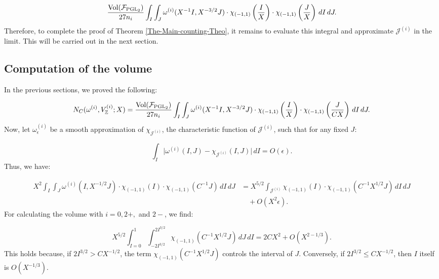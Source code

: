 \documentclass{article}
\def\Z{{\mathbb Z}}
\def\PGL{{\rm PGL}}
\def\Vol{{\rm Vol}}
\def\Z{{\mathbb Z}}
\begin{document}
\begin{equation*}
\frac{\Vol(\mathcal{F}_{\PGL_2})}{27n_i} \int_{I} \int_{J} \omega^{(i)}(X^{-1}I, X^{-3/2}J) \cdot \chi_{(-1,1)}\left(\frac{I}{X}\right) \cdot \chi_{(-1,1)}\left(\frac{J}{X}\right) \,dI \,dJ.
\end{equation*}
Therefore, to complete the proof of Theorem \ref{The-Main-counting-Theo}, it remains to evaluate this integral and approximate $\mathcal{J}^{(i)}$ in the limit. This will be carried out in the next section.
\subsection{Computation of the volume}
In the previous sections, we proved the following:

\begin{equation*}
N_C(\omega^{(i)}, V_{\Z}^{(i)}; X) = \frac{\Vol(\mathcal{F}_{\PGL_2})}{27n_i} \int_{I} \int_{J} \omega^{(i)}(X^{-1}I, X^{-3/2}J) \cdot \chi_{(-1,1)}\left(\frac{I}{X}\right) \cdot \chi_{(-1,1)}\left(\frac{J}{CX}\right) \, dI \, dJ.
\end{equation*}
Now, let $\omega^{(i)}_{\epsilon}$ be a smooth approximation of $\chi_{\mathcal{J}^{(i)}}$, the characteristic function of $\mathcal{J}^{(i)}$, such that for any fixed $J$:

\begin{equation*}
    \int_I \Big|\omega^{(i)}(I,J) - \chi_{\mathcal{J}^{(i)}}(I,J)\Big| \, dI = O(\epsilon).
\end{equation*}
Thus, we have:

\begin{align*}
    X^2 \int_{I} \int_{J} \omega^{(i)}(I, X^{-1/2}J) \cdot \chi_{(-1,1)}(I) \cdot \chi_{(-1,1)}(C^{-1}J) \, dI \, dJ &= X^{5/2} \int_{\mathcal{J}^{(i)}} \chi_{(-1,1)}(I) \cdot \chi_{(-1,1)}(C^{-1}X^{1/2}J) \, dI \, dJ \\
    &\quad + O(X^2 \epsilon).
\end{align*}
For calculating the volume with $i = 0, 2+, $ and $2-$, we find:


\begin{equation*}
    X^{5/2} \int_{I=0}^{1} \int_{-2I^{3/2}}^{2I^{3/2}} \chi_{(-1,1)}(C^{-1}X^{1/2}J) \, dJ \, dI = 2CX^2 + O(X^{2 - 1/3}).
\end{equation*}
This holds because, if $2I^{3/2} > CX^{-1/2}$, the term $\chi_{(-1,1)}(C^{-1}X^{1/2}J)$ controls the interval of $J$. Conversely, if $2I^{3/2} \leq CX^{-1/2}$, then $I$ itself is $O(X^{-1/3})$.
\end{document}
